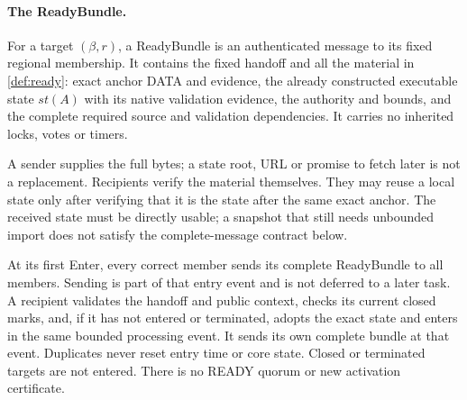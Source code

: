 \documentclass[11pt,a4paper]{article}
\begin{document}
\paragraph{The ReadyBundle.}
\label{sec:ready-bundle}
For a target $(\beta,r)$, a ReadyBundle is an authenticated message to
its fixed regional membership. It contains the fixed handoff and all
the material in \cref{def:ready}: exact anchor DATA and evidence,
the already constructed executable state $\mathit{st}(A)$ with its
native validation evidence, the authority and bounds, and the complete
required source and validation dependencies. It carries no inherited
locks, votes or timers.

A sender supplies the full bytes; a state root, URL or promise to fetch
later is not a replacement. Recipients verify the material themselves.
They may reuse a local state only after verifying that it is the state
after the same exact anchor. The received state must be directly
usable; a snapshot that still needs unbounded import does not satisfy
the complete-message contract below.

At its first Enter, every correct member sends its complete ReadyBundle
to all members. Sending is part of that entry event and is not deferred
to a later task. A recipient validates the handoff and public context,
checks its current closed marks, and, if it has not entered or
terminated, adopts the exact state and enters in the same bounded
processing event. It sends its own complete bundle at that event.
Duplicates never reset entry time or core state. Closed or terminated
targets are not entered. There is no READY quorum or new activation
certificate.
\end{document}
